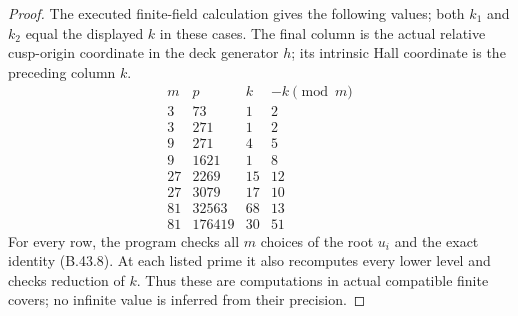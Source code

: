 \begin{proof}
The executed finite-field calculation gives the following
values; both $k_1$ and $k_2$ equal the displayed $k$ in these
cases. The final column is the actual relative cusp-origin
coordinate in the deck generator $h$; its intrinsic Hall
coordinate is the preceding column $k$.
\[
\begin{array}{c|r|r|r}
 m&p&k&-k\pmod m\\\hline
 3&73&1&2\\
 3&271&1&2\\
 9&271&4&5\\
 9&1621&1&8\\
 27&2269&15&12\\
 27&3079&17&10\\
 81&32563&68&13\\
 81&176419&30&51
\end{array}                                                  \tag{B.43.14}
\]
For every row, the program checks all $m$ choices of the
root $u_i$ and the exact identity (B.43.8).  At each listed
prime it also recomputes every lower level and checks
reduction of $k$.  Thus these are computations in actual
compatible finite covers; no infinite value is inferred
from their precision.


\end{proof}
